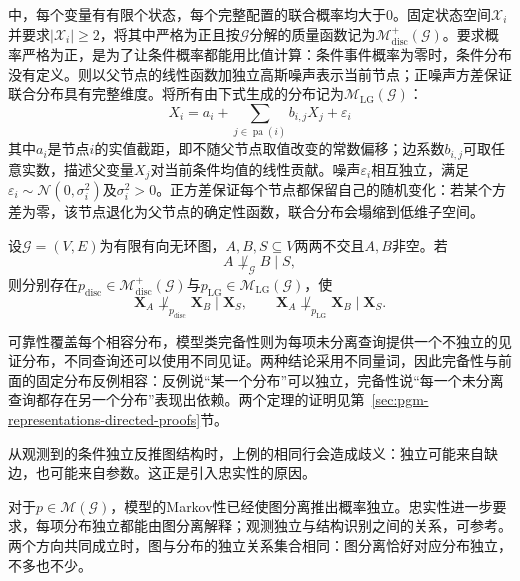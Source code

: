中，每个变量有有限个状态，每个完整配置的联合概率均大于$0$。固定状态空间$\mathcal{X}_i$并要求$|\mathcal{X}_i|\geq2$，将其中严格为正且按$\mathcal{G}$分解的质量函数记为$\mathcal{M}_{\mathrm{disc}}^{+}(\mathcal{G})$。要求概率严格为正，是为了让条件概率都能用比值计算：条件事件概率为零时，条件分布没有定义。则以父节点的线性函数加独立高斯噪声表示当前节点；正噪声方差保证联合分布具有完整维度。将所有由下式生成的分布记为$\mathcal{M}_{\mathrm{LG}}(\mathcal{G})$：
\[
  X_i=a_i+\sum_{j\in\operatorname{pa}(i)}b_{i,j}X_j+\varepsilon_i
\]
其中$a_i$是节点$i$的实值截距，即不随父节点取值改变的常数偏移；边系数$b_{i,j}$可取任意实数，描述父变量$X_j$对当前条件均值的线性贡献。噪声$\varepsilon_i$相互独立，满足$\varepsilon_i\sim\mathcal{N}(0,\sigma_i^2)$及$\sigma_i^2>0$。正方差保证每个节点都保留自己的随机变化：若某个方差为零，该节点退化为父节点的确定性函数，联合分布会塌缩到低维子空间。

\begin{theorem}[d-分离在特定模型类中的完备性]
  \label{thm:pgm-directed-completeness}
  设$\mathcal{G}=(V,E)$为有限有向无环图，$A,B,S\subseteq V$两两不交且$A,B$非空。若
  \[
    A\not\perp_{\mathcal{G}}B\mid S,
  \]
  则分别存在$p_{\mathrm{disc}}\in\mathcal{M}_{\mathrm{disc}}^{+}(\mathcal{G})$与$p_{\mathrm{LG}}\in\mathcal{M}_{\mathrm{LG}}(\mathcal{G})$，使
  \begin{equation}
    \bm{X}_A\not\perp_{p_{\mathrm{disc}}}\bm{X}_B\mid\bm{X}_S,
    \qquad
    \bm{X}_A\not\perp_{p_{\mathrm{LG}}}\bm{X}_B\mid\bm{X}_S.
    \label{eq:pgm-directed-completeness}
  \end{equation}
\end{theorem}

可靠性覆盖每个相容分布，模型类完备性则为每项未分离查询提供一个不独立的见证分布，不同查询还可以使用不同见证。两种结论采用不同量词，因此完备性与前面的固定分布反例相容：反例说“某一个分布”可以独立，完备性说“每一个未分离查询都存在另一个分布”表现出依赖。两个定理的证明见第~\ref{sec:pgm-representations-directed-proofs}节。

从观测到的条件独立反推图结构时，上例的相同行会造成歧义：独立可能来自缺边，也可能来自参数。这正是引入忠实性的原因。

对于$p\in\mathcal{M}(\mathcal{G})$，模型的Markov性已经使图分离推出概率独立。忠实性进一步要求，每项分布独立都能由图分离解释；观测独立与结构识别之间的关系，可参考。两个方向共同成立时，图与分布的独立关系集合相同：图分离恰好对应分布独立，不多也不少。

